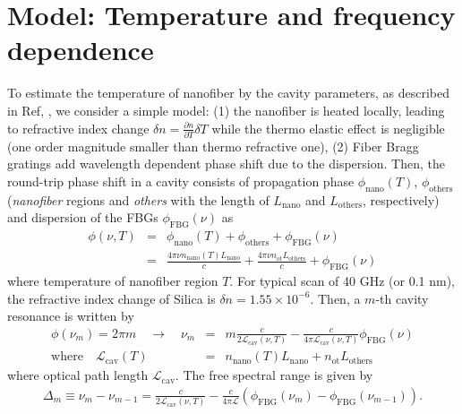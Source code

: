 \documentclass[aps,pra, onecolumn,superscriptaddress,nopacs,floatfix, showkeys, notitlepage]{revtex4-1}
\begin{document}
\section{Model: Temperature and frequency dependence}
To estimate the temperature of nanofiber by the cavity parameters, as described in Ref, \cite{Wuttke2013}, we consider a simple model: (1) the nanofiber is heated locally, leading to refractive index change $\delta n = \frac{\partial n}{\partial T}\delta T$ while the thermo elastic effect is negligible (one order magnitude smaller than thermo refractive one), (2) Fiber Bragg gratings add wavelength dependent phase shift due to the dispersion.  
Then, the round-trip phase shift in a cavity consists of propagation phase $\phi_\mathrm{nano}(T)$, $\phi_\mathrm{others}$ (\textit{nanofiber} regions and \textit{others} with the length of $L_\mathrm{nano}$ and $L_\mathrm{others}$, respectively) and dispersion of the FBGs $\phi_\mathrm{FBG}(\nu)$ as
\begin{eqnarray}
    \phi(\nu,T)&=&\phi_\mathrm{nano}(T)+\phi_\mathrm{others}+\phi_\mathrm{FBG}(\nu)\\
    &=&\frac{4\pi \nu n_\mathrm{nano}(T)L_\mathrm{nano}}{c}+\frac{4\pi \nu  n_\mathrm{ot} L_\mathrm{others}}{c}
    +\phi_\mathrm{FBG}(\nu)
\end{eqnarray}
where temperature of nanofiber region $T$.
For typical scan of 40 GHz (or 0.1 nm), the refractive index change of Silica is $\delta n = 1.55 \times 10^{-6}$. Then, a $m$-th cavity resonance is written by 
\begin{eqnarray}
 \phi(\nu_m)=2\pi m \quad\rightarrow\quad
    \nu_m &=& m\frac{c}{2 \mathcal{L}_\mathrm{cav}(\nu, T)}-\frac{c}{4\pi \mathcal{L}_\mathrm{cav}(\nu, T)}\phi_\mathrm{FBG}(\nu)\\
\mathrm{where}\quad    \mathcal{L}_\mathrm{cav}(T)  &=&n_\mathrm{nano}(T)L_\mathrm{nano}+n_\mathrm{ot} L_\mathrm{others}
\end{eqnarray}
where optical path length $\mathcal{L}_\mathrm{cav}$. 
The free spectral range is given by
\begin{eqnarray}
    \Delta_m\equiv\nu_m-\nu_{m-1}=
    \frac{c}{2\mathcal{L}_\mathrm{
cav}(\nu, T)}-\frac{c}{4\pi\mathcal{L}}\left(\phi_\mathrm{FBG}(\nu_m)-\phi_\mathrm{FBG}(\nu_{m-1})\right).
\end{eqnarray}
\end{document}
